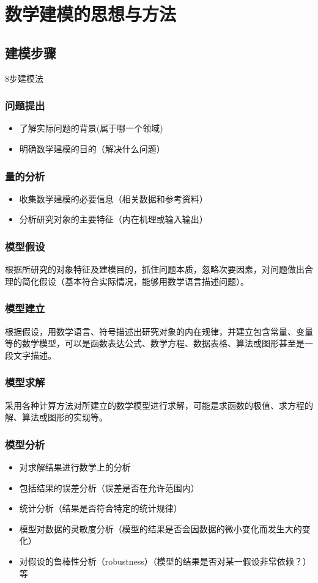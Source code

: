 \documentclass[openany]{progbookcn}
\begin{document}
\chapter{数学建模的思想与方法}

\section{建模步骤}
8步建模法
\subsection{问题提出}
\begin{itemize}
\item 了解实际问题的背景(属于哪一个领域)
\item 明确数学建模的目的（解决什么问题）
\end{itemize}

\subsection{量的分析}
\begin{itemize}
\item 收集数学建模的必要信息（相关数据和参考资料）
\item 分析研究对象的主要特征（内在机理或输入输出）
\end{itemize}

\subsection{模型假设}
根据所研究的对象特征及建模目的，抓住问题本质，忽略次要因素，对问题做出合理的简化假设（基本符合实际情况，能够用数学语言描述问题）。
\subsection{模型建立}
根据假设，用数学语言、符号描述出研究对象的内在规律，并建立包含常量、变量等的数学模型，可以是函数表达公式、数学方程、数据表格、算法或图形甚至是一段文字描述。
\subsection{模型求解}
采用各种计算方法对所建立的数学模型进行求解，可能是求函数的极值、求方程的解、算法或图形的实现等。
\subsection{模型分析}
\begin{itemize}
\item 对求解结果进行数学上的分析
\item 包括结果的误差分析（误差是否在允许范围内）
\item 统计分析（结果是否符合特定的统计规律）
\item 模型对数据的灵敏度分析（模型的结果是否会因数据的微小变化而发生大的变化）
\item 对假设的鲁棒性分析（robustness）（模型的结果是否对某一假设非常依赖？）等
\end{itemize}
\end{document}

